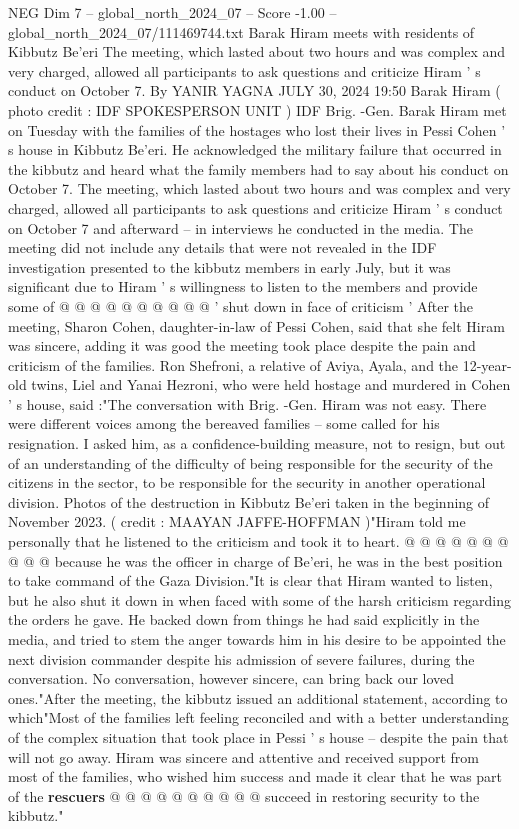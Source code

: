\begin{textsample}{NEG Dim 7 – global\_north\_2024\_07 – Score -1.00 – global\_north\_2024\_07/111469744.txt}  \label{ex:f7_neg_412}
Barak Hiram meets with residents of Kibbutz Be'eri The meeting, which lasted about two hours and was complex and very charged, allowed all participants to ask questions and criticize Hiram ' s conduct on October 7.
By YANIR YAGNA JULY 30, 2024 19:50 Barak Hiram ( photo credit : IDF SPOKESPERSON UNIT ) IDF Brig. -Gen.
Barak Hiram met on Tuesday with the families of the hostages who lost their lives in Pessi Cohen ' s house in Kibbutz Be'eri.
He acknowledged the military failure that occurred in the kibbutz and heard what the family members had to say about his conduct on October 7.
The meeting, which lasted about two hours and was complex and very charged, allowed all participants to ask questions and criticize Hiram ' s conduct on October 7 and afterward -- in interviews he conducted in the media.
The meeting did not include any details that were not revealed in the IDF investigation presented to the kibbutz members in early July, but it was significant due to Hiram ' s willingness to listen to the members and provide some of @ @ @ @ @ @ @ @ @ @ ' shut down in face of criticism ' After the meeting, Sharon Cohen, daughter-in-law of Pessi Cohen, said that she felt Hiram was sincere, adding it was good the meeting took place despite the pain and criticism of the families.
Ron Shefroni, a relative of Aviya, Ayala, and the 12-year-old twins, Liel and Yanai Hezroni, who were held hostage and murdered in Cohen ' s house, said :"The conversation with Brig. -Gen.
Hiram was not easy.
There were different voices among the bereaved families -- some called for his resignation.
I asked him, as a confidence-building measure, not to resign, but out of an understanding of the difficulty of being responsible for the security of the citizens in the sector, to be responsible for the security in another operational division.
Photos of the destruction in Kibbutz Be'eri taken in the beginning of November 2023. ( credit : MAAYAN JAFFE-HOFFMAN )"Hiram told me personally that he listened to the criticism and took it to heart. @ @ @ @ @ @ @ @ @ @ because he was the officer in charge of Be'eri, he was in the best position to take command of the Gaza Division."It is clear that Hiram wanted to listen, but he also shut it down in when faced with some of the harsh criticism regarding the orders he gave.
He backed down from things he had said explicitly in the media, and tried to stem the anger towards him in his desire to be appointed the next division commander despite his admission of severe failures, during the conversation.
No conversation, however sincere, can bring back our loved ones."After the meeting, the kibbutz issued an additional statement, according to which"Most of the families left feeling reconciled and with a better understanding of the complex situation that took place in Pessi ' s house -- despite the pain that will not go away.
Hiram was sincere and attentive and received support from most of the families, who wished him success and made it clear that he was part of the \textbf{rescuers} @ @ @ @ @ @ @ @ @ @ succeed in restoring security to the kibbutz."

\end{textsample}
